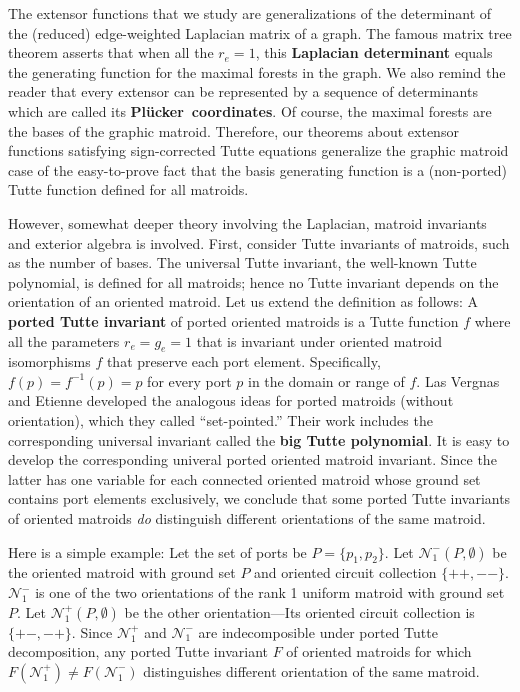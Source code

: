\documentclass[12pt]{article}
\theoremstyle{definition}
\newcommand{\Plucker}{Pl\"{u}cker\ }
\begin{document}
The extensor functions that we study are generalizations of the determinant
of the (reduced) edge-weighted Laplacian matrix of a graph.  
The famous matrix tree theorem asserts that when all the $r_e=1$, this
\textbf{Laplacian determinant} equals the generating function
for the maximal forests in the graph.  We also remind 
the reader that every extensor can be represented by a sequence of determinants
which are called its \textbf{\Plucker coordinates}.
Of course, the maximal forests
are the bases of the graphic matroid.
Therefore, our theorems about extensor functions satisfying
sign-corrected Tutte equations generalize the graphic matroid 
case of the easy-to-prove fact that the basis generating function
is a (non-ported) Tutte function defined for all matroids.  

However, somewhat deeper theory involving
the Laplacian, matroid invariants and exterior algebra is 
involved.  First, consider 
Tutte invariants of matroids, such as the number of bases. 
The universal Tutte invariant, the well-known Tutte polynomial,
is defined for all matroids; hence no Tutte invariant depends
on the orientation of an oriented matroid.  Let us extend the
definition as follows:
A \textbf{ported Tutte invariant} of ported oriented matroids
is a Tutte function $f$ where all the parameters 
$r_e=g_e=1$ 
that is invariant
under oriented matroid isomorphisms $f$ that 
preserve each port element.
Specifically, $f(p)=f^{-1}(p)=p$ for every port $p$ in the
domain or range of $f$.  
Las Vergnas and Etienne 
\cite{MR0419272,SetPointedLV,EtienneLasVergnasMorphismVectorial}
developed the analogous ideas for ported matroids (without orientation),
which they called ``set-pointed.'' Their work includes the corresponding
universal invariant called the \textbf{big Tutte polynomial}.  It is
easy to develop the corresponding univeral ported oriented matroid invariant.
Since the latter has one variable for each connected oriented 
matroid whose ground set
contains port elements exclusively, we conclude that some ported Tutte
invariants of oriented matroids \emph{do} distinguish different 
orientations of the same matroid. 

Here is a simple example:  Let the set of ports be $P=\{p_1,p_2\}$.  
Let $\mathcal{N}_1^-(P,\emptyset)$ be the oriented matroid 
with ground set $P$ and oriented
circuit collection $\{++,--\}$. $\mathcal{N}_1^-$ is one of the 
two orientations of the 
rank 1 uniform matroid with ground set $P$.
Let $\mathcal{N}_1^+(P,\emptyset)$ be the other orientation---Its oriented circuit 
collection
is $\{+-,-+\}$.  Since $\mathcal{N}_1^+$ and $\mathcal{N}_1^-$ are 
indecomposible under ported Tutte
decomposition, any ported Tutte invariant $F$ of oriented matroids for which
$F(\mathcal{N}_1^+)\neq F(\mathcal{N}_1^-)$ distinguishes different 
orientation of the same matroid.
\end{document}

